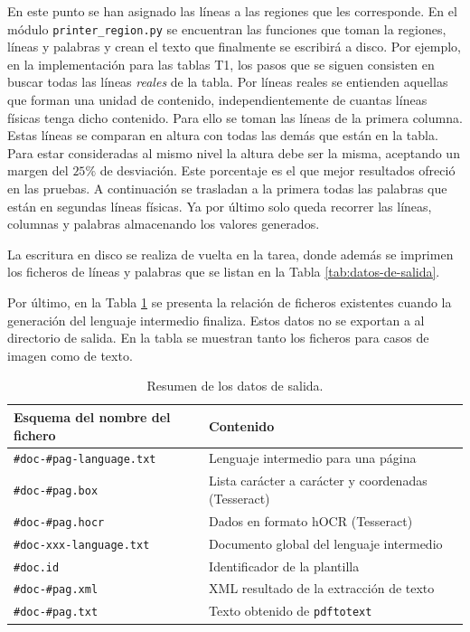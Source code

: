 En este punto se han asignado las líneas a las regiones que les corresponde. En el módulo \verb|printer_region.py| se encuentran las funciones que toman la regiones, líneas y palabras y crean el texto que finalmente se escribirá a disco. Por ejemplo, en la implementación para las tablas T1, los pasos que se siguen consisten en buscar todas las líneas \emph{reales} de la tabla. Por líneas reales se entienden aquellas que forman una unidad de contenido, independientemente de cuantas líneas físicas tenga dicho contenido. Para ello se toman las líneas de la primera columna. Estas líneas se comparan en altura con todas las demás que están en la tabla. Para estar consideradas al mismo nivel la altura debe ser la misma, aceptando un margen del $ 25\% $ de desviación. Este porcentaje es el que mejor resultados ofreció en las pruebas. A continuación se trasladan a la primera todas las palabras que están en segundas líneas físicas. Ya por último solo queda recorrer las líneas, columnas y palabras almacenando los valores generados.

La escritura en disco se realiza de vuelta en la tarea, donde además se imprimen los ficheros de líneas y palabras que se listan en la Tabla \ref{tab:datos-de-salida}.


Por último, en la Tabla \ref{tab:datos-intermedios} se presenta la relación de ficheros existentes cuando la generación del lenguaje intermedio finaliza. Estos datos no se exportan a al directorio de salida. En la tabla se muestran tanto los ficheros para casos de imagen como de texto.

\begin{table}[ht]
    \centering
    \begin{tabular}{l l}
        Esquema del nombre del fichero & Contenido \\
        \hline
        \hline
        \verb|#doc-#pag-language.txt| & Lenguaje intermedio para una página \\
        \verb|#doc-#pag.box| & Lista carácter a carácter y coordenadas (Tesseract) \\
        \verb|#doc-#pag.hocr| & Dados en formato hOCR (Tesseract) \\
        \verb|#doc-xxx-language.txt| & Documento global del lenguaje intermedio \\
        \verb|#doc.id| & Identificador de la plantilla \\
        \verb|#doc-#pag.xml| & XML resultado de la extracción de texto \\
        \verb|#doc-#pag.txt| & Texto obtenido de \verb|pdftotext| \\
    \end{tabular}
    \caption{Resumen de los datos de salida.}    
    \label{tab:datos-intermedios}
\end{table}

